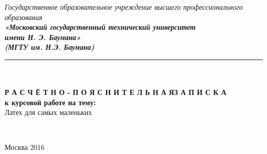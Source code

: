 


\begin{center}
	\hfill \break
	\textit{
		\normalsize{Государственное образовательное учреждение высшего профессионального образования}}\\ 
	
	\textit{
		\normalsize  {\bf  «Московский государственный технический университет}\\ 
		\normalsize  {\bf имени Н. Э. Баумана»}\\
		\normalsize  {\bf (МГТУ им. Н.Э. Баумана)}\\
	}
	\noindent\rule{\textwidth}{2pt}
	\hfill \break
	\noindent
	\\
	\noindent
	\\
	\hfill\break
	\hfill \break
	\hfill \break
	\hfill \break
	\normalsize{\bf Р А С Ч Ё Т Н О - П О Я С Н И Т Е Л Ь Н А Я\space\space З А П И С К А}\\
	\normalsize{\bf к курсовой работе на тему:}\\
	\hfill \break
	\large{Латех для самых маленьких}\\
	\hfill \break
	\hfill \break
	\hfill \break
	\hfill \break
	\hfill \break

	\normalsize {
		\noindent
	}\\
	\hfill \break
	
	\normalsize {
		\noindent
	}
	\hfill \break
	\hfill \break
	\hfill \break
	\hfill \break
\end{center}
\hfill \break
\hfill \break
\begin{center} Москва 2016 \end{center}

\thispagestyle{empty} %



